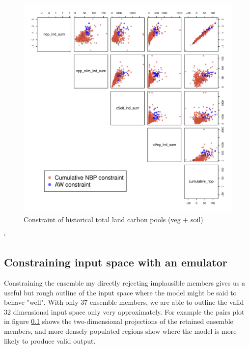 \documentclass[gmd, manuscript]{copernicus}
\begin{document}
\begin{figure}[t]
\includegraphics[width=12cm]{./graphics/cumulative_nbp_constrained_pairs.pdf}
\caption{Constraint of historical total land carbon pools (veg + soil)}
\label{fig:total-land-carbon-sink-1}
\end{figure}` 


\subsection{Constraining input space with an emulator}

Constraining the ensemble my directly rejecting implausible members gives us a useful but rough outline of the input space where the model might be said to behave "well". With only 37 ensemble members, we are able to outline the valid 32 dimensional input space only very approximately. For example the pairs plot in figure \ref{} shows the two-dimensional projections of the retained ensemble members, and more densely populated regions show where the model is more likely to produce valid output.
\end{document}
